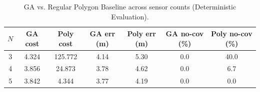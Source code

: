 \begin{table}[t]
\centering
\caption{GA vs. Regular Polygon Baseline across sensor counts (Deterministic Evaluation).}
\label{tab:ga_vs_polygon_all}
\begin{tabular}{ccccccc}
\hline
$N$ & GA cost & Poly cost & GA err (m) & Poly err (m) & GA no-cov (\%) & Poly no-cov (\%) \\
\hline
3 & 4.324 & 125.772 & 4.14 & 5.30 & 0.0 & 40.0 \\
4 & 3.856 & 24.873 & 3.78 & 4.62 & 0.0 & 6.7 \\
5 & 3.842 & 4.344 & 3.77 & 4.19 & 0.0 & 0.0 \\
\hline
\end{tabular}
\end{table}